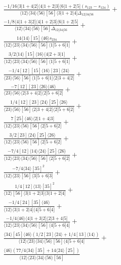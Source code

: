 \documentclass[varwidth, border=5pt]{standalone}
\begin{document}
\begin{my}
$\begin{gathered}
\scriptscriptstyle\frac{-1/16⟨3|1+4|2]⟨4|1+2|3]⟨6|1+2|5](s_{123}-s_{124})}{⟨12⟩⟨34⟩⟨56⟩[56]⟨3|1+2|4]Δ_{12|34|56}}+\\
\scriptscriptstyle\frac{-1/8⟨4|1+3|2]⟨4|1+2|3]⟨6|1+2|5]}{⟨12⟩⟨34⟩⟨56⟩[56]Δ_{12|34|56}}+\\
\scriptscriptstyle\frac{14⟨14⟩[15]⟨46⟩s_{234}}{⟨12⟩⟨23⟩⟨34⟩⟨56⟩[56]⟨1|5+6|1]}+\\
\scriptscriptstyle\frac{3/2⟨14⟩[15]⟨16⟩⟨4|2+3|1]}{⟨12⟩⟨23⟩⟨34⟩⟨56⟩[56]⟨1|5+6|1]}+\\
\scriptscriptstyle\frac{-1/4[12][15]⟨16⟩[23]⟨24⟩}{⟨23⟩⟨56⟩[56]⟨1|5+6|1]⟨2|3+4|2]}+\\
\scriptscriptstyle\frac{-7[12][23]⟨26⟩⟨46⟩}{⟨23⟩⟨56⟩⟨2|3+4|2]⟨2|5+6|2]}+\\
\scriptscriptstyle\frac{1/4[12][23]⟨24⟩[25]⟨26⟩}{⟨23⟩⟨56⟩[56]⟨2|3+4|2]⟨2|5+6|2]}+\\
\scriptscriptstyle\frac{7[25]⟨46⟩⟨2|1+4|3]}{⟨12⟩⟨23⟩⟨56⟩[56]⟨2|5+6|2]}+\\
\scriptscriptstyle\frac{3/2[23]⟨24⟩[25]⟨26⟩}{⟨12⟩⟨23⟩⟨56⟩[56]⟨2|5+6|2]}+\\
\scriptscriptstyle\frac{-7/4[12]⟨14⟩⟨24⟩[25]⟨26⟩}{⟨12⟩⟨23⟩⟨34⟩⟨56⟩[56]⟨2|5+6|2]}+\\
\scriptscriptstyle\frac{-7/4⟨34⟩[35]^2}{⟨12⟩⟨23⟩[56]⟨3|5+6|3]}+\\
\scriptscriptstyle\frac{1/4[12]⟨13⟩[35]^2}{⟨12⟩[56]⟨3|1+2|3]⟨3|1+2|4]}+\\
\scriptscriptstyle\frac{-1/4[24][35]⟨46⟩}{⟨12⟩⟨3|1+2|4]⟨4|5+6|4]}+\\
\scriptscriptstyle\frac{-1/4⟨46⟩⟨4|1+3|2]⟨2|3+4|5]}{⟨12⟩⟨23⟩⟨34⟩⟨56⟩[56]⟨4|5+6|4]}+\\
\scriptscriptstyle\frac{⟨34⟩[45]⟨46⟩(1/2[23]⟨24⟩+1/4[13]⟨14⟩)}{⟨12⟩⟨23⟩⟨34⟩⟨56⟩[56]⟨4|5+6|4]}+\\
\scriptscriptstyle\frac{⟨46⟩(77/4⟨34⟩[35]+14⟨24⟩[25])}{⟨12⟩⟨23⟩⟨34⟩⟨56⟩[56]}\phantom{+}
\end{gathered}$
\end{my}
\end{document}
